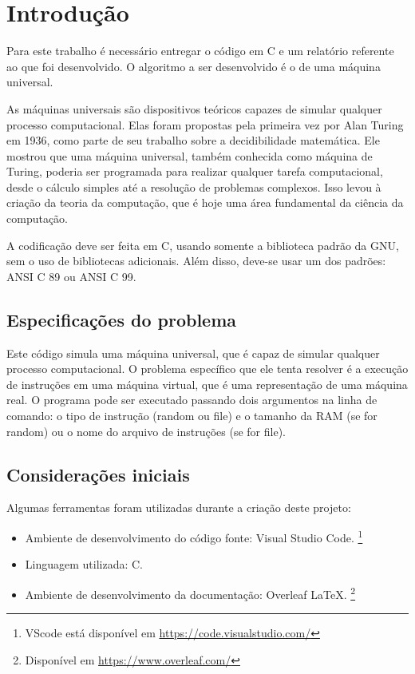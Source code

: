 \documentclass{article}
\begin{document}


\section{Introdução}

\DESCRICAO{}
Para este trabalho é necessário entregar o código em C e um relatório referente ao que foi desenvolvido. O algoritmo a ser desenvolvido é o de uma máquina universal.

As máquinas universais são dispositivos teóricos capazes de simular qualquer processo computacional. Elas foram propostas pela primeira vez por Alan Turing em 1936, como parte de seu trabalho sobre a decidibilidade matemática. Ele mostrou que uma máquina universal, também conhecida como máquina de Turing, poderia ser programada para realizar qualquer tarefa computacional, desde o cálculo simples até a resolução de problemas complexos. Isso levou à criação da teoria da computação, que é hoje uma área fundamental da ciência da computação.

A codificação deve ser feita em C, usando somente a biblioteca padrão da GNU, sem o uso de bibliotecas adicionais. Além disso, deve-se usar um dos padrões: ANSI C 89 ou ANSI C 99.

\subsection{Especificações do problema}

\DESCRICAO{}
Este código simula uma máquina universal, que é capaz de simular qualquer processo computacional. O problema específico que ele tenta resolver é a execução de instruções em uma máquina virtual, que é uma representação de uma máquina real. O programa pode ser executado passando dois argumentos na linha de comando: o tipo de instrução (random ou file) e o tamanho da RAM (se for random) ou o nome do arquivo de instruções (se for file).

\subsection{Considerações iniciais}

Algumas ferramentas foram utilizadas durante a criação deste projeto:

\begin{itemize}
\item Ambiente de desenvolvimento do código fonte: Visual Studio Code. \footnote{VScode está disponível em \url{https://code.visualstudio.com/}}
\item Linguagem utilizada: C.
\item Ambiente de desenvolvimento da documentação: Overleaf \LaTeX. \footnote{Disponível em \url{https://www.overleaf.com/}}
\end{itemize}
\end{document}
